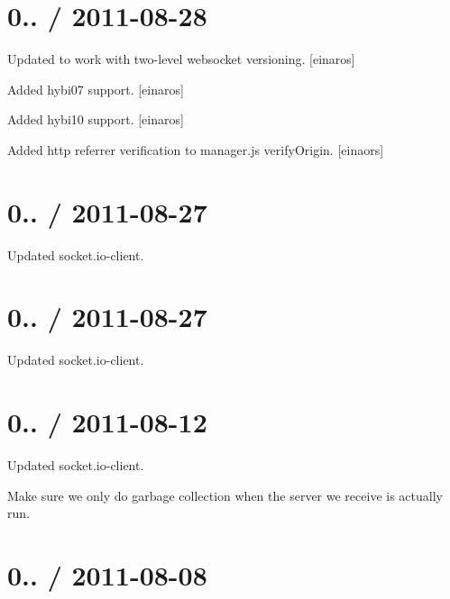 \section*{0.. / 2011-\/08-\/28 }


\begin{DoxyItemize}
\item Updated to work with two-\/level websocket versioning. \mbox{[}einaros\mbox{]}
\item Added hybi07 support. \mbox{[}einaros\mbox{]}
\item Added hybi10 support. \mbox{[}einaros\mbox{]}
\item Added http referrer verification to manager.\+js verify\+Origin. \mbox{[}einaors\mbox{]}
\end{DoxyItemize}

\section*{0.. / 2011-\/08-\/27 }


\begin{DoxyItemize}
\item Updated socket.\+io-\/client.
\end{DoxyItemize}

\section*{0.. / 2011-\/08-\/27 }


\begin{DoxyItemize}
\item Updated socket.\+io-\/client.
\end{DoxyItemize}

\section*{0.. / 2011-\/08-\/12 }


\begin{DoxyItemize}
\item Updated socket.\+io-\/client.
\item Make sure we only do garbage collection when the server we receive is actually run.
\end{DoxyItemize}

\section*{0.. / 2011-\/08-\/08 }


